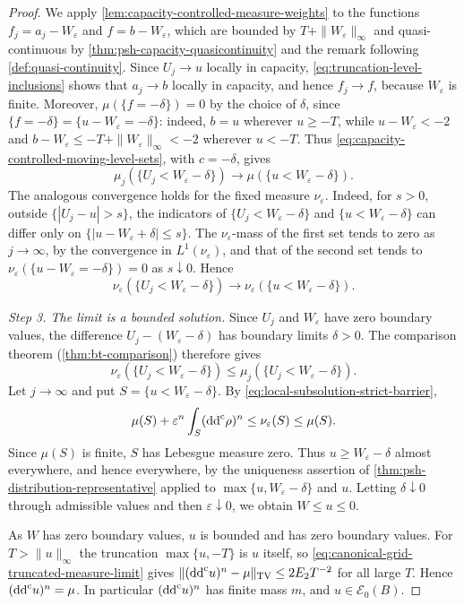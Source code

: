 \begin{proof}
We apply \cref{lem:capacity-controlled-measure-weights} to the functions $f_j=a_j-W_\varepsilon$ and $f=b-W_\varepsilon$, which are bounded by $T+\|W_\varepsilon\|_\infty$ and quasi-continuous by \cref{thm:psh-capacity-quasicontinuity} and the remark following \cref{def:quasi-continuity}. Since $U_j\to u$ locally in capacity, \eqref{eq:truncation-level-inclusions} shows that $a_j\to b$ locally in capacity, and hence $f_j\to f$, because $W_\varepsilon$ is finite. Moreover, $\mu(\{f=-\delta\})=0$ by the choice of $\delta$, since $\{f=-\delta\}=\{u-W_\varepsilon=-\delta\}$: indeed, $b=u$ wherever $u\geq-T$, while $u-W_\varepsilon<-2$ and $b-W_\varepsilon\leq-T+\|W_\varepsilon\|_\infty<-2$ wherever $u<-T$. Thus \eqref{eq:capacity-controlled-moving-level-sets}, with $c=-\delta$, gives
\[
 \mu_j(\{U_j<W_\varepsilon-\delta\})
                       \longrightarrow\mu(\{u<W_\varepsilon-\delta\}).
\]
The analogous convergence holds for the fixed measure $\nu_\varepsilon$. Indeed, for $s>0$, outside $\{|U_j-u|>s\}$, the indicators of $\{U_j<W_\varepsilon-\delta\}$ and $\{u<W_\varepsilon-\delta\}$ can differ only on $\{|u-W_\varepsilon+\delta|\leq s\}$. The $\nu_\varepsilon$-mass of the first set tends to zero as $j\to\infty$, by the convergence in $L^1(\nu_\varepsilon)$, and that of the second set tends to $\nu_\varepsilon(\{u-W_\varepsilon=-\delta\})=0$ as $s\downarrow0$. Hence
\[
 \nu_\varepsilon(\{U_j<W_\varepsilon-\delta\})\longrightarrow\nu_\varepsilon(\{u<W_\varepsilon-\delta\}).
\]

\emph{Step 3. The limit is a bounded solution.}
Since $U_j$ and $W_\varepsilon$ have zero boundary values, the difference $U_j-(W_\varepsilon-\delta)$ has boundary limits $\delta>0$. The comparison theorem (\cref{thm:bt-comparison}) therefore gives
\[
 \nu_\varepsilon(\{U_j<W_\varepsilon-\delta\})
                       \leq\mu_j(\{U_j<W_\varepsilon-\delta\}).
\]
Let $j\to\infty$ and put $S=\{u<W_\varepsilon-\delta\}$. By \eqref{eq:local-subsolution-strict-barrier},
\[
 \mu(S)+\varepsilon^n\int_S(\mathrm{dd}^{\mathrm{c}}\rho)^n\leq\nu_\varepsilon(S)\leq\mu(S).
\]
Since $\mu(S)$ is finite, $S$ has Lebesgue measure zero. Thus $u\geq W_\varepsilon-\delta$ almost everywhere, and hence everywhere, by the uniqueness assertion of \cref{thm:psh-distribution-representative} applied to $\max\{u,W_\varepsilon-\delta\}$ and $u$. Letting $\delta\downarrow0$ through admissible values and then $\varepsilon\downarrow0$, we obtain $W\leq u\leq0$.

As $W$ has zero boundary values, $u$ is bounded and has zero boundary values. For $T>\|u\|_\infty$ the truncation $\max\{u,-T\}$ is $u$ itself, so \eqref{eq:canonical-grid-truncated-measure-limit} gives $\|(\mathrm{dd}^{\mathrm{c}} u)^n-\mu\|_{\mathrm{TV}}\leq2E_2T^{-2}$ for all large $T$. Hence $(\mathrm{dd}^{\mathrm{c}} u)^n=\mu$. In particular $(\mathrm{dd}^{\mathrm{c}} u)^n$ has finite mass $m$, and $u\in\mathcal E_0(B)$.


\end{proof}
